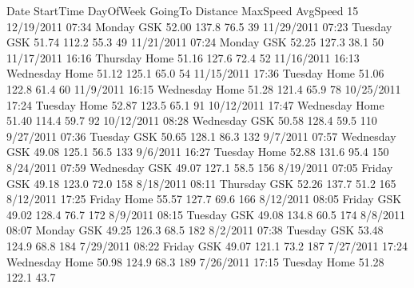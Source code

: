 \documentclass[letterpaper,10pt,english]{jupyterBook}
\begin{document}
\begin{sphinxVerbatim}[commandchars=\\\{\}]
\PYG{p}{[}\PYG{p}{]}
\end{sphinxVerbatim}

\begin{sphinxVerbatim}[commandchars=\\\{\}]
           Date StartTime  DayOfWeek GoingTo  Distance  MaxSpeed  AvgSpeed  \PYGZbs{}
15   12/19/2011     07:34     Monday     GSK     52.00     137.8      76.5   
39   11/29/2011     07:23    Tuesday     GSK     51.74     112.2      55.3   
49   11/21/2011     07:24     Monday     GSK     52.25     127.3      38.1   
50   11/17/2011     16:16   Thursday    Home     51.16     127.6      72.4   
52   11/16/2011     16:13  Wednesday    Home     51.12     125.1      65.0   
54   11/15/2011     17:36    Tuesday    Home     51.06     122.8      61.4   
60    11/9/2011     16:15  Wednesday    Home     51.28     121.4      65.9   
78   10/25/2011     17:24    Tuesday    Home     52.87     123.5      65.1   
91   10/12/2011     17:47  Wednesday    Home     51.40     114.4      59.7   
92   10/12/2011     08:28  Wednesday     GSK     50.58     128.4      59.5   
110   9/27/2011     07:36    Tuesday     GSK     50.65     128.1      86.3   
132    9/7/2011     07:57  Wednesday     GSK     49.08     125.1      56.5   
133    9/6/2011     16:27    Tuesday    Home     52.88     131.6      95.4   
150   8/24/2011     07:59  Wednesday     GSK     49.07     127.1      58.5   
156   8/19/2011     07:05     Friday     GSK     49.18     123.0      72.0   
158   8/18/2011     08:11   Thursday     GSK     52.26     137.7      51.2   
165   8/12/2011     17:25     Friday    Home     55.57     127.7      69.6   
166   8/12/2011     08:05     Friday     GSK     49.02     128.4      76.7   
172    8/9/2011     08:15    Tuesday     GSK     49.08     134.8      60.5   
174    8/8/2011     08:07     Monday     GSK     49.25     126.3      68.5   
182    8/2/2011     07:38    Tuesday     GSK     53.48     124.9      68.8   
184   7/29/2011     08:22     Friday     GSK     49.07     121.1      73.2   
187   7/27/2011     17:24  Wednesday    Home     50.98     124.9      68.3   
189   7/26/2011     17:15    Tuesday    Home     51.28     122.1      43.7   


\end{sphinxVerbatim}
\end{document}
